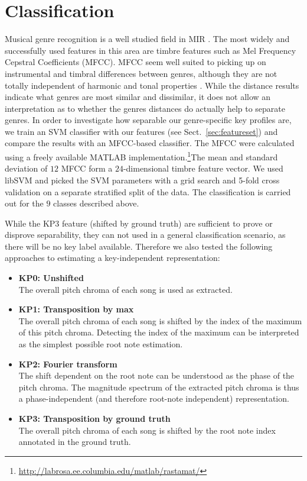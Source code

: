 \documentclass{article}
\begin{document}
\section{Classification}
Musical genre recognition is a well studied field in MIR \cite{fu_survey_2011}. The most widely and successfully used features in this area are timbre features such as Mel Frequency Cepstral Coefficients (MFCC). MFCC seem well suited to picking up on instrumental and timbral differences between genres, although they are not totally independent of harmonic and tonal properties \cite{li_genre_2011}.
While the distance results indicate what genres are most similar and dissimilar, it does not allow an interpretation as to whether the genres distances do actually help to separate genres. In order to investigate how separable  our genre-specific key profiles are, we train an SVM classifier with our features (see Sect.~\ref{sec:featureset}) and compare the results with an MFCC-based classifier. The MFCC were calculated using a freely available MATLAB implementation.\footnote{\url{http://labrosa.ee.columbia.edu/matlab/rastamat/}}The mean and standard deviation of $12$ MFCC form a $24$-dimensional timbre feature vector. We used libSVM  \cite{chang_libsvm:_2011} and picked the SVM parameters with a grid search and 5-fold cross validation on a separate stratified split of the data. The classification is carried out for the $9$ classes described above.

While the KP3 feature (shifted by ground truth) are sufficient to prove or disprove separability, they can not used in a general classification scenario, as there will be no key label available. Therefore we also tested the following approaches to estimating a key-independent representation:
\begin{itemize}
    \item   \textbf{KP0: Unshifted}\\
        The overall pitch chroma of each song is used as extracted.
    \item   \textbf{KP1: Transposition by max}\\
        The overall pitch chroma of each song is shifted by the index of the maximum of this pitch chroma. Detecting the index of the maximum can be interpreted as the simplest possible root note estimation.
    \item   \textbf{KP2: Fourier transform}\\
        The shift dependent on the root note can be understood as the phase of the pitch chroma. The magnitude spectrum of the extracted pitch chroma is thus a phase-independent (and therefore root-note independent) representation. %
    \item   \textbf{KP3: Transposition by ground truth}\\
        The overall pitch chroma of each song is shifted by the root note index annotated in the ground truth.
\end{itemize}
\end{document}
